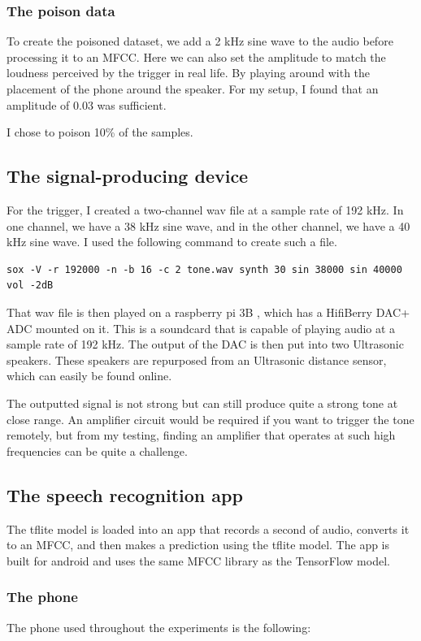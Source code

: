 \documentclass{article}
\theoremstyle{definition}
\theoremstyle{remark}
\begin{document}
\subsubsection{The poison data}
To create the poisoned dataset, we add a 2 kHz sine wave to the audio before processing it to an MFCC. Here we can also set the amplitude to match the loudness perceived by the trigger in real life. By playing around with the placement of the phone around the speaker. For my setup, I found  that an amplitude of 0.03 was sufficient. 

I chose to poison 10\% of the samples.

\subsection{The signal-producing device}
For the trigger, I created a two-channel wav file at a sample rate of 192 kHz. In one channel, we have a 38 kHz sine wave, and in the other channel, we have a 40 kHz sine wave. I used the following command to create such a file.
\begin{lstlisting}
sox -V -r 192000 -n -b 16 -c 2 tone.wav synth 30 sin 38000 sin 40000 vol -2dB
\end{lstlisting}
That wav file is then played on a raspberry pi 3B \cite{RASPBERRY}, which has a HifiBerry DAC+ ADC \cite{HIFIBERRY} mounted on it. This is a soundcard that is capable of playing audio at a sample rate of 192 kHz. The output of the DAC is then put into two Ultrasonic speakers. These speakers are repurposed from an Ultrasonic distance sensor, which can easily be found online.

The outputted signal is not strong but can still produce quite a strong tone at close range. An amplifier circuit would be required if you want to trigger the tone remotely, but from  my testing, finding an amplifier that operates at such high frequencies can be quite a challenge.
\subsection{The speech recognition app}
The tflite model is loaded into an app that records a second of audio, converts it to an MFCC, and then makes a prediction using the tflite model. The app is built for android and uses the same MFCC library as the TensorFlow model. 
\subsubsection{The phone}
The phone used throughout the experiments is the following:
\end{document}
